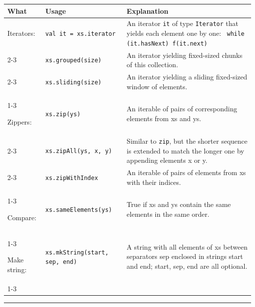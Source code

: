 \documentclass[article, a5paper]{memoir}
\newcommand{\LangColor}{scalared}
\newcommand{\head}[1]{{\bfseries {\color{\LangColor}{#1}}\par\vspace{1mm}\hrule\vspace{-2mm}}}
\renewcommand{\arraystretch}{0.9}
\newcommand{\Newline}{\vspace{\baselineskip}}
\begin{document}
{\small\renewcommand{\arraystretch}{1.1}
\begin{tabular}{@{}l p{3.4cm} p{6.8cm}}

\textbf{What} & \textbf{Usage} & \textbf{Explanation} \\ \hline

  Iterators: & \texttt{val it = xs.iterator} & An iterator \texttt{it} of type \texttt{Iterator} that yields each element one by one: \texttt{ while (it.hasNext) f(it.next)}\\   \cline{2-3}

  & \texttt{xs.grouped(size)} & An iterator yielding fixed-sized chunks of this collection.\\\cline{2-3}
  & \texttt{xs.sliding(size)} & An iterator yielding a sliding fixed-sized window of elements.\\\cline{1-3}

  Zippers: & \texttt{xs.zip(ys)} &  	An iterable of pairs of corresponding elements from xs and ys.\\   \cline{2-3}
  & \texttt{xs.zipAll(ys, x, y)} & Similar to \texttt{zip}, but the shorter sequence is extended to match the longer one by appending elements x or y.\\\cline{2-3}
  & \texttt{xs.zipWithIndex} & An iterable of pairs of elements from xs with their indices.\\\cline{1-3}

  Compare: & \texttt{xs.sameElements(ys)} & True if xs and ys contain the same elements in the same order.\\   \cline{1-3}

 Make string: & \texttt{xs.mkString(start, sep, end)} & A string with all elements of xs between separators sep enclosed in strings start and end; start, sep, end are all optional.\\ \cline{1-3}



\end{tabular}
}

\Newline\vspace{-0.5em}
\head{\texttt{Seq[A]}}\Newline
\end{document}
